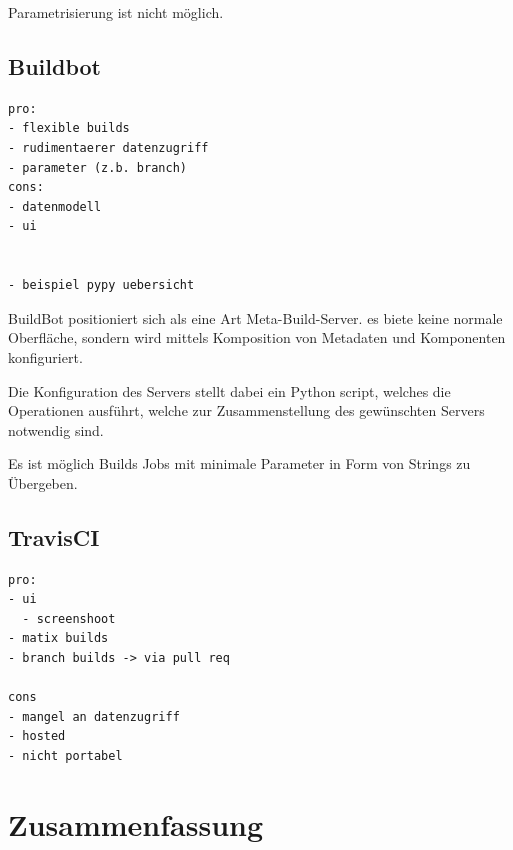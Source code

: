 Parametrisierung ist nicht möglich.

\subsection{Buildbot}


\begin{verbatim}
pro:
- flexible builds
- rudimentaerer datenzugriff
- parameter (z.b. branch)
cons:
- datenmodell
- ui


- beispiel pypy uebersicht

\end{verbatim}


BuildBot positioniert sich als eine Art Meta-Build-Server.
es biete keine normale Oberfläche, sondern wird mittels
Komposition von Metadaten und Komponenten konfiguriert.

Die Konfiguration des Servers stellt dabei ein Python script,
welches die Operationen ausführt, welche zur Zusammenstellung des gewünschten Servers notwendig sind.

Es ist möglich Builds Jobs mit minimale Parameter in Form von Strings zu Übergeben.

\subsection{TravisCI}

\begin{verbatim}
pro:
- ui
  - screenshoot
- matix builds
- branch builds -> via pull req

cons
- mangel an datenzugriff
- hosted
- nicht portabel
\end{verbatim}



\section{Zusammenfassung}



